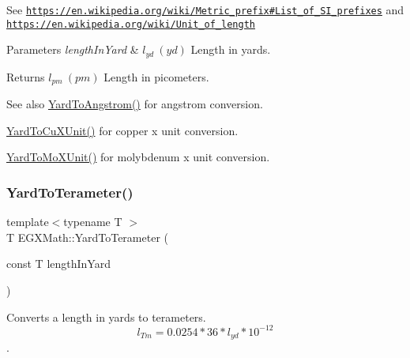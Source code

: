 See \href{https://en.wikipedia.org/wiki/Metric_prefix#List_of_SI_prefixes}{\tt https\+://en.\+wikipedia.\+org/wiki/\+Metric\+\_\+prefix\#\+List\+\_\+of\+\_\+\+S\+I\+\_\+prefixes} and \href{https://en.wikipedia.org/wiki/Unit_of_length}{\tt https\+://en.\+wikipedia.\+org/wiki/\+Unit\+\_\+of\+\_\+length} 
\begin{DoxyParams}{Parameters}
{\em length\+In\+Yard} & $ l_{yd}\ (yd)$ Length in yards. \\
\hline
\end{DoxyParams}
\begin{DoxyReturn}{Returns}
$ l_{pm}\ (pm)$ Length in picometers. 
\end{DoxyReturn}
\begin{DoxySeeAlso}{See also}
\mbox{\hyperlink{group___e_g_x_math-_conversions-_length_conversions-_imperial-_yard-_non-_s_i_gaacff083bdc6b954da2e4b63f857cb429}{Yard\+To\+Angstrom()}} for angstrom conversion. 

\mbox{\hyperlink{group___e_g_x_math-_conversions-_length_conversions-_imperial-_yard-_non-_s_i_gabf4916569d4002f5c0ec8bbef8207980}{Yard\+To\+Cu\+X\+Unit()}} for copper x unit conversion. 

\mbox{\hyperlink{group___e_g_x_math-_conversions-_length_conversions-_imperial-_yard-_non-_s_i_ga81f1fa776a2154865e8ee4be46ef693d}{Yard\+To\+Mo\+X\+Unit()}} for molybdenum x unit conversion. 
\end{DoxySeeAlso}
\mbox{\label{group___e_g_x_math-_conversions-_length_conversions-_imperial-_yard-_s_i_ga67c4bd89e074c1615f4f67d6877e93d0}} 
\subsubsection{\texorpdfstring{Yard\+To\+Terameter()}{YardToTerameter()}}
{\footnotesize\ttfamily template$<$typename T $>$ \\
T E\+G\+X\+Math\+::\+Yard\+To\+Terameter (\begin{DoxyParamCaption}\item[{const T}]{length\+In\+Yard }\end{DoxyParamCaption})}



Converts a length in yards to terameters. \[ l_{Tm}=0.0254 * 36 * l_{yd} * 10^{-12} \]. 

